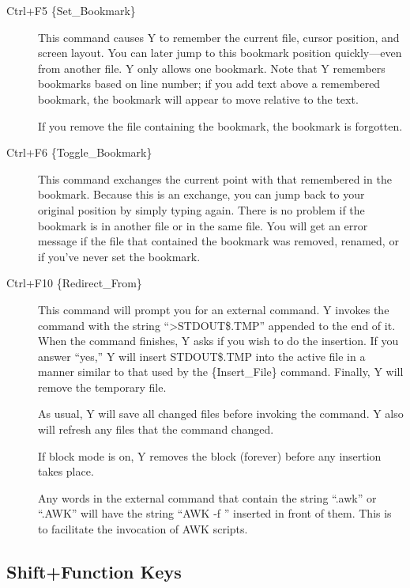 \begin{description}
\item[Ctrl+F5 \{Set\_Bookmark\}] This command causes Y to remember the current file, cursor
  position, and screen layout. You can later jump to this bookmark position quickly---even from
  another file. Y only allows one bookmark. Note that Y remembers bookmarks based on line
  number; if you add text above a remembered bookmark, the bookmark will appear to move relative
  to the text.

  If you remove the file containing the bookmark, the bookmark is forgotten.


\item[Ctrl+F6 \{Toggle\_Bookmark\}] This command exchanges the current point with that
  remembered in the bookmark. Because this is an exchange, you can jump back to your original
  position by simply typing  again. There is no problem if the bookmark is in
  another file or in the same file. You will get an error message if the file that contained the
  bookmark was removed, renamed, or if you've never set the bookmark.

\item[Ctrl+F10 \{Redirect\_From\}] This command will prompt you for an external command. Y
  invokes the command with the string ``>STDOUT\$.TMP'' appended to the end of it. When the
  command finishes, Y asks if you wish to do the insertion. If you answer ``yes,'' Y will insert
  STDOUT\$.TMP into the active file in a manner similar to that used by the \{Insert\_File\}
  command. Finally, Y will remove the temporary file.

  As usual, Y will save all changed files before invoking the command. Y also will refresh any
  files that the command changed.

  If block mode is on, Y removes the block (forever) before any insertion takes place.

  Any words in the external command that contain the string ``.awk'' or ``.AWK'' will have the
  string ``AWK -f '' inserted in front of them. This is to facilitate the invocation of AWK
  scripts.

\end{description}

\subsection{Shift+Function Keys}

